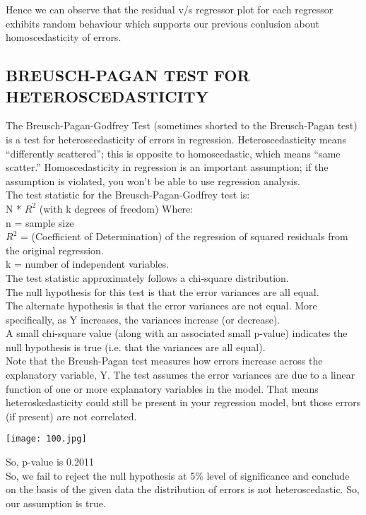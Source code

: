 \documentclass[a4paper,12pt,twoside]{book}
\begin{document}
\newpage
Hence we can observe that the residual v/s regressor plot for each regressor exhibits random behaviour which supports our previous conlusion about homoscedasticity of errors.
\subsection{BREUSCH-PAGAN TEST FOR HETEROSCEDASTICITY}
The Breusch-Pagan-Godfrey Test (sometimes shorted to the Breusch-Pagan test) is a test for heteroscedasticity of errors in regression. Heteroscedasticity means “differently scattered”; this is opposite to homoscedastic, which means “same scatter.” Homoscedasticity in regression is an important assumption; if the assumption is violated, you won’t be able to use regression analysis.\\
The test statistic for the Breusch-Pagan-Godfrey test is:\\
N * $R^2$ (with k degrees of freedom)
Where:\\
n = sample size\\
$R^2$ = (Coefficient of Determination) of the regression of squared residuals from the original regression.\\
k = number of independent variables.\\
The test statistic approximately follows a chi-square distribution.\\

The null hypothesis for this test is that the error variances are all equal.\\
The alternate hypothesis is that the error variances are not equal. More specifically, as Y increases, the variances increase (or decrease).\\
A small chi-square value (along with an associated small p-value) indicates the null hypothesis is true (i.e. that the variances are all equal).\\

Note that the Breush-Pagan test measures how errors increase across the explanatory variable, Y. The test assumes the error variances are due to a linear function of one or more explanatory variables in the model. That means heteroskedasticity could still be present in your regression model, but those errors (if present) are not correlated.
\begin{center}
\texttt{[image: 100.jpg]}\\
\end{center}
So, p-value is 0.2011\\
So, we fail to reject the null hypothesis at 5\% level of significance and conclude on the basis of the given data the distribution of errors is not heteroscedastic. So, our assumption is true. 
\newpage
\end{document}

